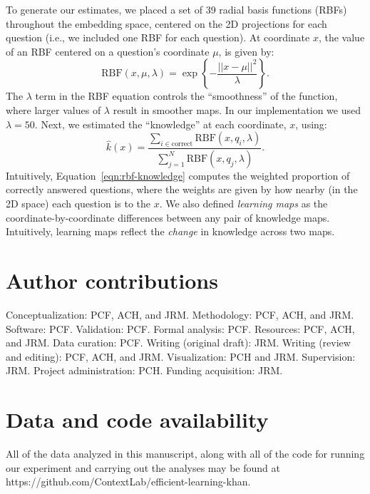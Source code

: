 \documentclass[10pt]{article}
\begin{document}
To generate our estimates, we placed a set of 39 radial basis functions (RBFs)
throughout the embedding space, centered on the 2D projections for each
question (i.e., we included one RBF for each question). At coordinate $x$, the
value of an RBF centered on a question's coordinate $\mu$, is given by:
\begin{equation}
    \mathrm{RBF}(x, \mu, \lambda) = \exp\left\{-\frac{||x - \mu||^2}{\lambda}\right\}.
    \label{eqn:rbf}
\end{equation}
The $\lambda$ term in the RBF equation controls the ``smoothness'' of the
function, where larger values of $\lambda$ result in smoother maps. In our
implementation we used $\lambda = 50$.  Next, we estimated the ``knowledge''
at each coordinate, $x$, using:
\begin{equation}
    \hat{k}(x) = \frac{\sum_{i \in \mathrm{correct}} \mathrm{RBF}(x, q_i, \lambda)}{\sum_{j = 1}^N \mathrm{RBF}(x, q_j, \lambda)}.
    \label{eqn:rbf-knowledge}
\end{equation}
Intuitively, Equation~\ref{eqn:rbf-knowledge} computes the weighted proportion of
correctly answered questions, where the weights are given by how nearby (in the 2D space)
each question is to the $x$.  We also defined \textit{learning maps} as the coordinate-by-coordinate
differences between any pair of knowledge maps.  Intuitively, learning maps reflect the \textit{change}
in knowledge across two maps.

\section*{Author contributions}

Conceptualization: PCF, ACH, and JRM. Methodology: PCF, ACH, and JRM. Software:
PCF. Validation: PCF. Formal analysis: PCF. Resources: PCF, ACH, and JRM. Data
curation: PCF. Writing (original draft): JRM. Writing (review and editing):
PCF, ACH, and JRM. Visualization: PCH and JRM. Supervision: JRM. Project
administration: PCH. Funding acquisition: JRM.


\section*{Data and code availability}

All of the data analyzed in this manuscript, along with all of the code for
running our experiment and carrying out the analyses may be found at
https://github.com/Con\-text\-Lab/eff\-ic\-ient-learn\-ing-khan.
\end{document}
